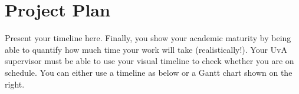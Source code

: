 \section{Project Plan}
\label{sec:project_plan}
Present your timeline here. Finally, you show your academic maturity by being able to quantify how much time your work will take (realistically!). Your UvA supervisor must be able to use your visual timeline to check whether you are on schedule. You can either use a timeline as below or a Gantt chart shown on the right.


\begin{center}
    \begin{chronology}[1]{0}{13}{60ex}[\linewidth]
    \end{chronology}
\end{center}

\newpage

